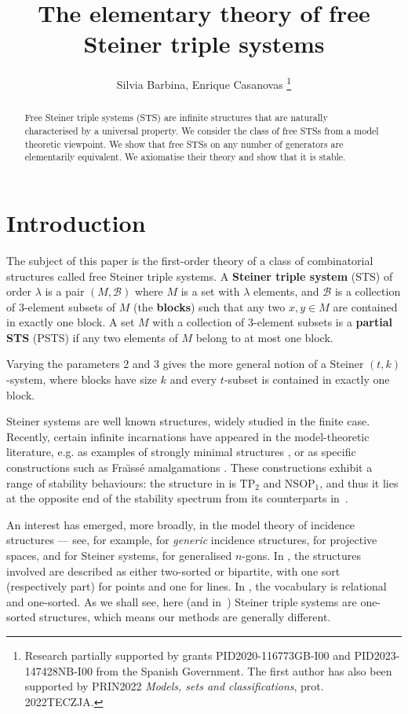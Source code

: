 \documentclass[a4paper, 11pt]{article}
\title{The elementary theory of free Steiner triple systems}
\author{Silvia Barbina,  Enrique Casanovas \thanks{Research partially supported by grants PID2020-116773GB-I00 and PID2023-147428NB-I00 from the Spanish Government. The first author has also been supported by PRIN2022 \textit{Models, sets and classifications}, prot. 2022TECZJA.}}
\theoremstyle{note}
\begin{document}
	\maketitle

		\begin{abstract}
Free Steiner triple systems (STS) are infinite structures that are naturally characterised by a universal property. We consider the class of free STSs from a model theoretic viewpoint. We show that free STSs on any number of generators are elementarily equivalent. We axiomatise their theory and show that it is stable.
	\end{abstract}
	
	\section{Introduction}
	
	The subject of this paper is the first-order theory of a class of combinatorial structures called free Steiner triple systems. 	
	A \textbf{Steiner triple system} (STS) of order $\lambda$ is a pair $(M, \mathcal{B})$ where $M$ is a set with $\lambda$ elements, and 
 $\mathcal{B}$ is a collection of 3-element subsets of $M$ (the \textbf{blocks})
such that any two $x, y \in M$ are contained in exactly one block. 
A set $M$ with a collection of 3-element subsets is a \textbf{partial STS} (PSTS) if any two elements of $M$ belong to at most one block.

 Varying the parameters 2 and 3 gives the more general notion of a Steiner $(t,k)$-system, where blocks have size $k$ and every $t$-subset is contained in exactly one block. 



Steiner systems are well known structures, widely studied in the finite case. Recently, certain infinite incarnations have appeared in the model-theoretic literature, e.g. as examples of strongly minimal structures \cite{baldwin-pao}, or as specific constructions such as Fra\"{\i}ss\'e amalgamations \cite{barcas}. These constructions exhibit a range of stability behaviours: the structure in \cite{barcas} is $\mathrm{TP}_2$ and $\mathrm{NSOP}_1$, and thus it lies at the opposite end of the stability spectrum from its counterparts in~\cite{baldwin-pao}.

An interest has emerged, more broadly, in the model theory of incidence structures --- see, for example, \cite{conant} for \textit{generic} incidence structures, \cite{hyttpao} for projective spaces, \cite{baldwin-pao} and \cite{bald22} for Steiner systems, \cite{ammertent} for generalised $n$-gons. In  \cite{ammertent,bald22,conant,hyttpao}, the structures involved are described as either two-sorted or bipartite, with one sort (respectively part) for points and one for lines. In \cite{baldwin-pao}, the vocabulary is relational and one-sorted.  As we shall see, here (and in~\cite{barcas})  Steiner triple systems are one-sorted structures, which means our methods are generally different.
\end{document}

